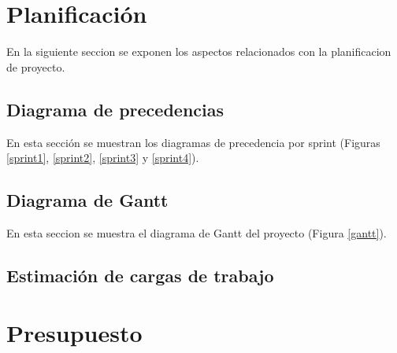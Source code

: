 \section{Planificación}
En la siguiente seccion se exponen los aspectos relacionados con la planificacion de proyecto. 

\subsection{Diagrama de precedencias}
En esta sección se muestran los diagramas de precedencia por sprint (Figuras \ref{sprint1}, \ref{sprint2}, \ref{sprint3} y \ref{sprint4}).



\subsection{Diagrama de Gantt}
En esta seccion se muestra el diagrama de Gantt del proyecto (Figura \ref{gantt}).


\subsection{Estimación de cargas de trabajo}

\section{Presupuesto}
